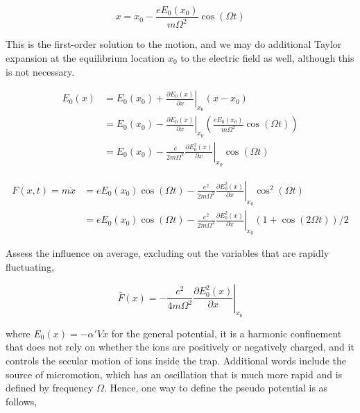 \begin{equation}\label{eq:staticmotion}
    x=x_0-\frac{eE_0(x_0)}{m\Omega^2}\cos(\Omega t)
\end{equation}

This is the first-order solution to the motion, and we may do additional Taylor expansion at the equilibrium location $x_0$ to the electric field as well, although this is not necessary.

\begin{equation}
    \begin{aligned}
        E_0(x) & =E_0\left(x_0\right)+\left.\frac{\partial E_0(x)}{\partial x}\right|_{x_0}\left(x-x_0\right)                                                    \\
               & =E_0\left(x_0\right)-\left.\frac{\partial E_0(x)}{\partial x}\right|_{x_0}\left(\frac{e E_0\left(x_0\right)}{m \Omega^2} \cos (\Omega t)\right) \\
               & =E_0\left(x_0\right)-\left.\frac{e}{2 m \Omega^2} \frac{\partial E_0^2(x)}{\partial x}\right|_{x_0} \cos (\Omega t)
    \end{aligned}
\end{equation}

\begin{equation}
    \begin{aligned}
        F(x, t)=m \ddot{x} & =e E_0\left(x_0\right) \cos (\Omega t)-\left.\frac{e^2}{2 m \Omega^2} \frac{\partial E_0^2(x)}{\partial x}\right|_{x_0} \cos ^2(\Omega t)        \\
                           & =e E_0\left(x_0\right) \cos (\Omega t)-\left.\frac{e^2}{2 m \Omega^2} \frac{\partial E_0^2(x)}{\partial x}\right|_{x_0}(1+\cos (2 \Omega t)) / 2
    \end{aligned}
\end{equation}

Assess the influence on average, excluding out the variables that are rapidly fluctuating,

\begin{equation}
    \bar{F}(x)=-\left.\frac{e^2}{4 m \Omega^2} \frac{\partial E_0^2(x)}{\partial x}\right|_{x_0}
\end{equation}

where \(E_0(x)=-\alpha'V x\) for the general potential, it is a harmonic confinement that does not rely on whether the ions are positively or negatively charged, and it controls the secular motion of ions inside the trap. Additional words include the source of micromotion, which has an oscillation that is much more rapid and is defined by frequency \(\Omega\). Hence, one way to define the pseudo potential is as follows,

